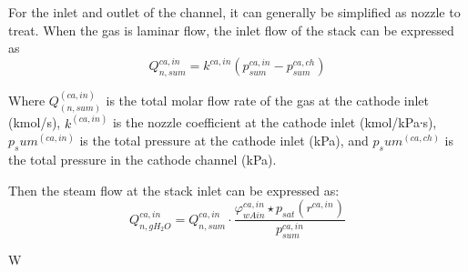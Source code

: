 For the inlet and outlet of the channel, it can generally be simplified as nozzle to treat. When the gas is laminar flow, the inlet flow of the stack can be expressed as
\begin{equation}
    Q_{n,s u m}^{c a,i n}=k^{c a,i n}(p_{s u m}^{c a,i n}-p_{s u m}^{c a,c h})
\end{equation}

Where $Q_(n,sum)^(ca,in)$ is the total molar flow rate of the gas at the cathode inlet (kmol/s), $k^(ca,in)$ is the nozzle coefficient at the cathode inlet (kmol/kPa∙s), $p_sum^(ca,in)$ is the total pressure at the cathode inlet (kPa), and $p_sum^(ca,ch)$ is the total pressure in the cathode channel (kPa).
\par
Then the steam flow at the stack inlet can be expressed as:
\begin{equation}
    Q_{n,g H_{2}O}^{c a,i n}=Q_{n,s u m}^{c a,i n}\cdot\frac{\varphi_{w A i n}^{c a,i n} \star p_{s a t}(r^{c a,i n})}{p_{s u m}^{c a,i n}}
\end{equation}

W